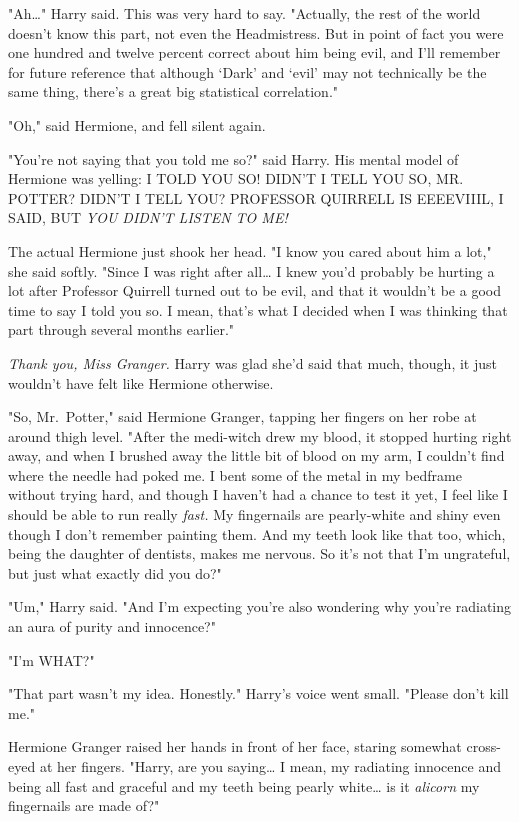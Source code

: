 "Ah{\ldots}" Harry said. This was very hard to say. "Actually, the rest of the
world doesn't know this part, not even the Headmistress. But in point of fact
you were one hundred and twelve percent correct about him being evil, and I'll
remember for future reference that although `Dark' and `evil' may not
technically be the same thing, there's a great big statistical correlation."

"Oh," said Hermione, and fell silent again.

"You're not saying that you told me so?" said Harry. His mental model of
Hermione was yelling: I TOLD YOU SO! DIDN'T I TELL YOU SO, MR. POTTER? DIDN'T I
TELL YOU? PROFESSOR QUIRRELL IS EEEEVIIIL, I SAID, BUT \emph{YOU DIDN'T LISTEN
TO ME!}

The actual Hermione just shook her head. "I know you cared about him a lot,"
she said softly. "Since I was right after all{\ldots} I knew you'd probably be
hurting a lot after Professor Quirrell turned out to be evil, and that it
wouldn't be a good time to say I told you so. I mean, that's what I decided
when I was thinking that part through several months earlier."

\emph{Thank you, Miss Granger.} Harry was glad she'd said that much, though, it
just wouldn't have felt like Hermione otherwise.

"So, Mr.~Potter," said Hermione Granger, tapping her fingers on her robe at
around thigh level. "After the medi-witch drew my blood, it stopped hurting
right away, and when I brushed away the little bit of blood on my arm, I
couldn't find where the needle had poked me. I bent some of the metal in my
bedframe without trying hard, and though I haven't had a chance to test it yet,
I feel like I should be able to run really \emph{fast.} My fingernails are
pearly-white and shiny even though I don't remember painting them. And my teeth
look like that too, which, being the daughter of dentists, makes me nervous. So
it's not that I'm ungrateful, but just what exactly did you do?"

"Um," Harry said. "And I'm expecting you're also wondering why you're radiating
an aura of purity and innocence?"

"I'm WHAT?"

"That part wasn't my idea. Honestly." Harry's voice went small. "Please don't
kill me."

Hermione Granger raised her hands in front of her face, staring somewhat
cross-eyed at her fingers. "Harry, are you saying{\ldots} I mean, my radiating
innocence and being all fast and graceful and my teeth being pearly
white{\ldots} is it \emph{alicorn} my fingernails are made of?"

